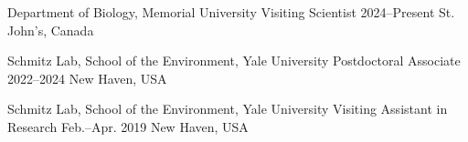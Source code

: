 

\begin{cventries}

\cventry
    {Department of Biology, Memorial University} %
    {Visiting Scientist} %
    {2024--Present} %
    {St. John's, Canada} %
    {}


\cventry
    {Schmitz Lab, School of the Environment, Yale University} %
    {Postdoctoral Associate} %
    {2022--2024} %
    {New Haven, USA} %
    {}


  \cventry
    {Schmitz Lab, School of the Environment, Yale University} %
    {Visiting Assistant in Research} %
    {Feb.--Apr. 2019} %
    {New Haven, USA} %
    {}

    

\end{cventries}
